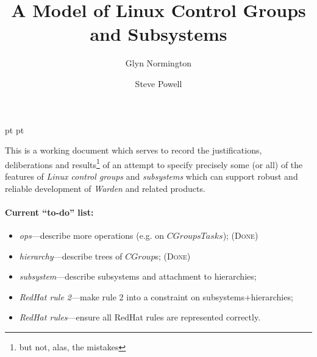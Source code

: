 \documentclass[a4paper,twoside,12pt]{article}
\begin{document}
 pt
 pt

\def\Slash{\slash\hspace{0pt}}

\title{A Model of Linux Control Groups and Subsystems}

\author{
Glyn Normington\and
Steve Powell
}

\maketitle
\thispagestyle{myheadings}
\setcounter{page}{1}


This is a working document which serves to record the justifications, deliberations and results\footnote{but 
not, alas, the mistakes} of an attempt to
specify precisely some (or all) of the features of \emph{Linux control groups} and \emph{subsystems} which can support robust and reliable development of \emph{Warden} and related products.

\paragraph{Current ``to-do'' list:}
\begin{itemize}
\item \emph{ops}---describe more operations (e.g. on $CGroupsTasks$); (\textsc{Done})
\item \emph{hierarchy}---describe trees of $CGroup$s; (\textsc{Done})
\item \emph{subsystem}---describe subsystems and attachment to hierarchies;
\item \emph{RedHat rule 2}---make rule 2 into a constraint on subsystems+hierarchies;
\item \emph{RedHat rules}---ensure all RedHat rules are represented correctly.
\end{itemize}


\newcommand{\true}{true}
\newcommand{\false}{false}
\renewcommand{\emptyset}{\varnothing}
\end{document}
